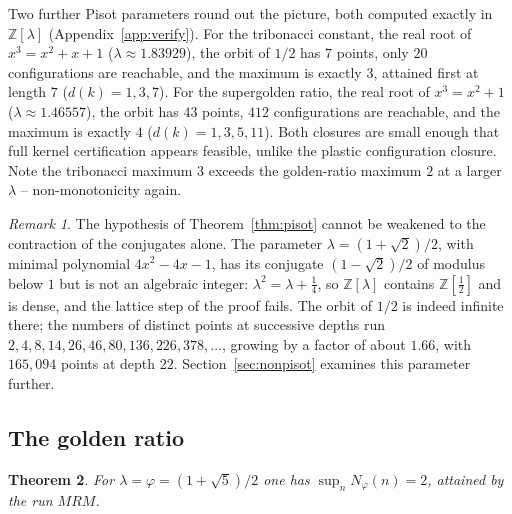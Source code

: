 \documentclass[11pt,reqno]{amsart}
\theoremstyle{plain}
\newtheorem{theorem}{Theorem}
\theoremstyle{definition}
\theoremstyle{remark}
\newtheorem{remark}[theorem]{Remark}
\newcommand{\Z}{\mathbb{Z}}
\begin{document}
Two further Pisot parameters round out the picture, both computed exactly in
$\Z[\lambda]$ (Appendix~\ref{app:verify}). For the tribonacci constant, the
real root of $x^3=x^2+x+1$ ($\lambda\approx1.83929$), the orbit of $1/2$ has
$7$ points, only $20$ configurations are reachable, and the maximum is exactly
$3$, attained first at length $7$ ($d(k)=1,3,7$). For the supergolden ratio,
the real root of $x^3=x^2+1$ ($\lambda\approx1.46557$), the orbit has $43$
points, $412$ configurations are reachable, and the maximum is exactly $4$
($d(k)=1,3,5,11$). Both closures are small enough that full kernel
certification appears feasible, unlike the plastic configuration closure. Note the tribonacci
maximum $3$ exceeds the golden-ratio maximum $2$ at a larger $\lambda$ --
non-monotonicity again.

\begin{remark}\label{rem:sharp}
The hypothesis of Theorem~\ref{thm:pisot} cannot be weakened to the contraction
of the conjugates alone. The parameter $\lambda=(1+\sqrt2)/2$, with minimal
polynomial $4x^2-4x-1$, has its conjugate $(1-\sqrt2)/2$ of modulus below $1$
but is not an algebraic integer: $\lambda^2=\lambda+\tfrac14$, so
$\Z[\lambda]$ contains $\Z[\tfrac12]$ and is dense, and the lattice step of the
proof fails. The orbit of $1/2$ is indeed infinite there; the numbers of
distinct points at successive depths run
$2,4,8,14,26,46,80,136,226,378,\dots$, growing by a factor of about $1.66$,
with $165{,}094$ points at depth $22$. Section~\ref{sec:nonpisot} examines this
parameter further.
\end{remark}

\subsection{The golden ratio}

\begin{theorem}\label{thm:phi}
For $\lambda=\varphi=(1+\sqrt5)/2$ one has $\sup_n N_\varphi(n)=2$, attained by
the run $MRM$.
\end{theorem}
\end{document}
